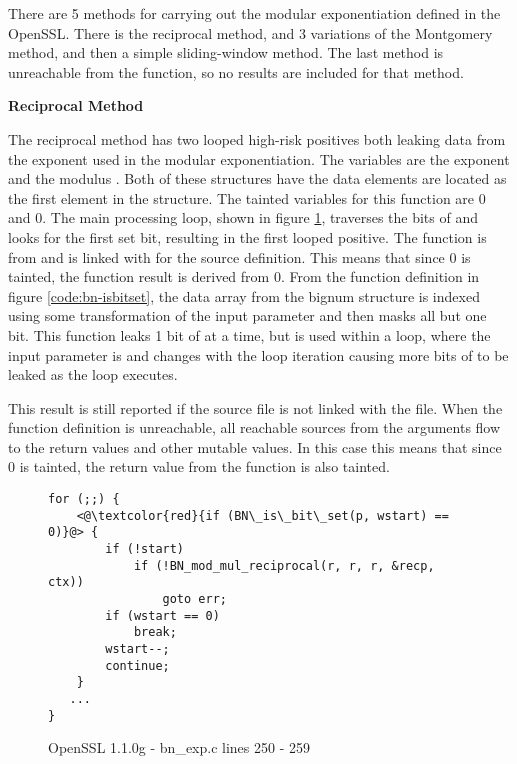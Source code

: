      There are 5 methods for carrying out the modular exponentiation defined in
     the OpenSSL. There is the reciprocal method, and 3 variations of the
     Montgomery method, and then a simple sliding-window method. The last method
     is unreachable from the  function, so no results are included for
     that method.


\noindent
\textbf{Reciprocal Method}

The reciprocal method has two looped high-risk positives both leaking data
  from the exponent used in the modular exponentiation. The variables are the
  exponent  and the modulus . Both of these structures have
  the data elements are located as the first element in the structure. The tainted
  variables for this function are  0 and  0. The main
  processing loop, shown in figure \ref{code:bnexp-recp}, traverses the bits of
   and looks for the first set bit, resulting in the first looped
  positive. The function  is from 
  and is linked with  for the source definition. This means
  that since  0 is tainted, the  function
  result is derived from  0. From the function definition in figure
  \ref{code:bn-isbitset}, the data array from the bignum structure is indexed
  using some transformation of the input parameter  and then masks all
  but one bit. This function leaks 1 bit of  at a time, but is used
  within a loop, where the input parameter is  and changes with
  the loop iteration causing more bits of  to be leaked as the loop
  executes.

  This result is still reported if the  source file is not linked with
  the  file. When the function definition is unreachable, all reachable
  sources from the arguments flow to the return values and other mutable
  values. In this case this means that since  0 is tainted, the return value
  from the  function is also tainted.

\begin{figure}[h!]
\begin{lstlisting}
for (;;) {
    <@\textcolor{red}{if (BN\_is\_bit\_set(p, wstart) == 0)}@> {
        if (!start)
            if (!BN_mod_mul_reciprocal(r, r, r, &recp, ctx))
                goto err;
        if (wstart == 0)
            break;
        wstart--;
        continue;
    }
   ...
}
\end{lstlisting}
\caption{OpenSSL 1.1.0g - bn\_exp.c lines 250 - 259}
\label{code:bnexp-recp}
\end{figure}



